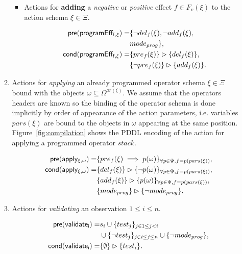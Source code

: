 \documentclass{article}
\newcommand{\pre}{\mathsf{pre}}     %
\newcommand{\cond}{\mathsf{cond}}   %
\begin{document}
\begin{itemize}
\begin{enumerate}
\begin{itemize}
\item Actions for {\bf adding} a {\em negative} or {\em positive} effect $f\in F_v(\xi)$ to the action schema $\xi\in\Xi$.

\begin{small}
\begin{align*}
\hspace*{7pt}\pre(\mathsf{programEff_{f,\xi}})=&\{\neg del_{f}(\xi),\neg add_{f}(\xi),\\
& mode_{prog}\},\\
\cond(\mathsf{programEff_{f,\xi}})=&\{pre_{f}(\xi)\}\rhd\{del_{f}(\xi)\},\\
&\{\neg pre_{f}(\xi)\}\rhd\{add_{f}(\xi)\}.
\end{align*}
\end{small}
\end{itemize}

\item Actions for {\em applying} an already programmed operator schema $\xi\in\Xi$ bound with the objects $\omega\subseteq\Omega^{ar(\xi)}$. We assume that the operators headers are known so the binding of the operator schema is done implicitly by order of appearance of the action parameters, i.e. variables $pars(\xi)$ are bound to the objects in $\omega$ appearing at the same position. Figure~\ref{fig:compilation} shows the PDDL encoding of the action for applying a programmed operator $stack$.
\begin{small}
\begin{align*}
\hspace*{7pt}\pre(\mathsf{apply_{\xi,\omega}})=&\{pre_{f}(\xi)\implies p(\omega)\}_{\forall p\in\Psi,f=p(pars(\xi))},\\
\cond(\mathsf{apply_{\xi,\omega}})=&\{del_{f}(\xi)\}\rhd\{\neg p(\omega)\}_{\forall p\in\Psi,f=p(pars(\xi))},\\
&\{add_{f}(\xi)\}\rhd\{p(\omega)\}_{\forall p\in\Psi,f=p(pars(\xi))},\\
&\{mode_{prog}\}\rhd\{\neg mode_{prog}\}.
\end{align*}
\end{small}

\item Actions for {\em validating} an observation {\tt\small $1\leq i\leq n$}. 
\begin{small}
\begin{align*}
\hspace*{7pt}\pre(\mathsf{validate_{i}})=&s_i\cup\{test_j\}_{j\in 1\leq j<i}\\
&\cup\{\neg test_j\}_{j\in i\leq j\leq n}\cup \{\neg mode_{prog}\},\\
\cond(\mathsf{validate_{i}})=&\{\emptyset\}\rhd\{test_i\}.
\end{align*}
\end{small}
\end{enumerate}
\end{itemize}
\end{document}
